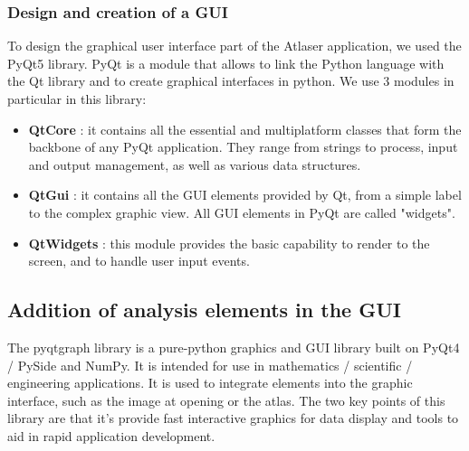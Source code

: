 \documentclass[a4paper,12pt]{report}
\begin{document}
\subsubsection{Design and creation of a GUI}
To design the graphical user interface part of the Atlaser application, we used the PyQt5 library. PyQt is a module that allows to link the Python language with the Qt library and to create graphical interfaces in python. We use 3 modules in particular in this library:
\vspace{0.5\baselineskip}
\begin{itemize}
    \item \textbf{QtCore} : it contains all the essential and multiplatform classes that form the backbone of any PyQt application. They range from strings to process, input and output management, as well as various data structures.
    \vspace{0.5\baselineskip}
    \item \textbf{QtGui} : it contains all the GUI elements provided by Qt, from a simple label to the complex graphic view. All GUI elements in PyQt are called "widgets".
    \vspace{0.5\baselineskip}
    \item \textbf{QtWidgets} : this module provides the basic capability to render to the screen, and to handle user input events.\\
\end{itemize}

\subsection{Addition of analysis elements in the GUI}
The pyqtgraph library is a pure-python graphics and GUI library built on PyQt4 / PySide and NumPy. It is intended for use in mathematics / scientific / engineering applications. It is used to integrate elements into the graphic interface, such as the image at opening or the atlas. The two key points of this library are that it's provide fast interactive graphics for data display and tools to aid in rapid application development. \\
\end{document}
